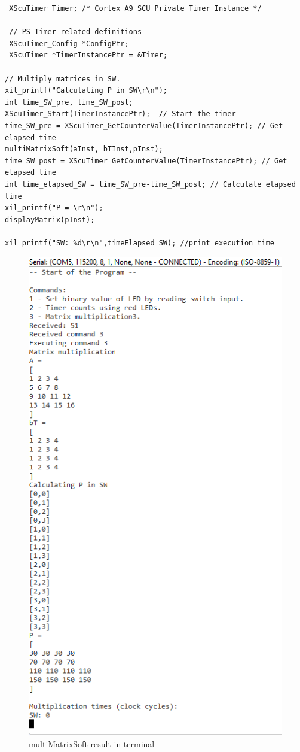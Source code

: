  \begin{lstlisting}
 XScuTimer Timer; /* Cortex A9 SCU Private Timer Instance */
 
 // PS Timer related definitions
 XScuTimer_Config *ConfigPtr;
 XScuTimer *TimerInstancePtr = &Timer;
 
// Multiply matrices in SW.
xil_printf("Calculating P in SW\r\n");
int time_SW_pre, time_SW_post;
XScuTimer_Start(TimerInstancePtr); 	// Start the timer
time_SW_pre = XScuTimer_GetCounterValue(TimerInstancePtr); // Get elapsed time
multiMatrixSoft(aInst, bTInst,pInst);
time_SW_post = XScuTimer_GetCounterValue(TimerInstancePtr); // Get elapsed time
int time_elapsed_SW = time_SW_pre-time_SW_post; // Calculate elapsed time
xil_printf("P = \r\n");
displayMatrix(pInst);

xil_printf("SW: %d\r\n",timeElapsed_SW); //print execution time
\end{lstlisting}



\begin{figure}[H]
	\centering
	\includegraphics[width=\textwidth]{Images/multiMatrixSoft.png}
	\caption{multiMatrixSoft result in terminal}
	\label{fig:multiMatrixSoft}
\end{figure}

 
 